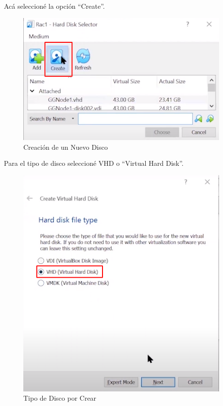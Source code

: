 \documentclass{article}
\begin{document}
Acá seleccioné la opción ``Create''.

\begin{figure}[H]
		\begin{center}
			\includegraphics[width=0.95\textwidth]{vm_shared_disk_create.png}
		\end{center}
		\caption{Creación de un Nuevo Disco}
\end{figure}

Para el tipo de disco seleccioné VHD o ``Virtual Hard Disk''.

\begin{figure}[H]
		\begin{center}
			\includegraphics[width=0.95\textwidth]{vm_shared_disk_creation_type.png}
		\end{center}
		\caption{Tipo de Disco por Crear}
\end{figure}
\end{document}
